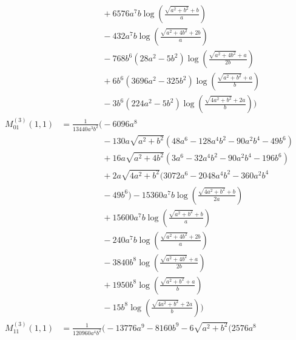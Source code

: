 \begin{align*}
&\phantom{{}=\frac{1}{13440 a^{3} b^{2}}\Bigg(}+ 6576 a^{7} b \log\left(\frac{\sqrt{a^{2} + b^{2}} + b}{a}\right)\\
&\phantom{{}=\frac{1}{13440 a^{3} b^{2}}\Bigg(}- 432 a^{7} b \log\left(\frac{\sqrt{a^{2} + 4 b^{2}} + 2 b}{a}\right)\\
&\phantom{{}=\frac{1}{13440 a^{3} b^{2}}\Bigg(}- 768 b^{6} \left(28 a^{2} - 5 b^{2}\right) \log\left(\frac{\sqrt{a^{2} + 4 b^{2}} + a}{2 b}\right)\\
&\phantom{{}=\frac{1}{13440 a^{3} b^{2}}\Bigg(}+ 6 b^{6} \left(3696 a^{2} - 325 b^{2}\right) \log\left(\frac{\sqrt{a^{2} + b^{2}} + a}{b}\right)\\
&\phantom{{}=\frac{1}{13440 a^{3} b^{2}}\Bigg(}- 3 b^{6} \left(224 a^{2} - 5 b^{2}\right) \log\left(\frac{\sqrt{4 a^{2} + b^{2}} + 2 a}{b}\right)\Bigg)\\[1.2ex]
M^{(3)}_{01}(1,1) &= \frac{1}{13440 a^{3} b^{2}}\Bigg(- 6096 a^{8}\\
&\phantom{{}=\frac{1}{13440 a^{3} b^{2}}\Bigg(}- 130 a \sqrt{a^{2} + b^{2}}\left(48 a^{6} - 128 a^{4} b^{2} - 90 a^{2} b^{4} - 49 b^{6}\right)\\
&\phantom{{}=\frac{1}{13440 a^{3} b^{2}}\Bigg(}+ 16 a \sqrt{a^{2} + 4 b^{2}}\left(3 a^{6} - 32 a^{4} b^{2} - 90 a^{2} b^{4} - 196 b^{6}\right)\\
&\phantom{{}=\frac{1}{13440 a^{3} b^{2}}\Bigg(}+ 2 a \sqrt{4 a^{2} + b^{2}}\bigl(3072 a^{6} - 2048 a^{4} b^{2} - 360 a^{2} b^{4}\\
&\phantom{{}=\frac{1}{13440 a^{3} b^{2}}\Bigg(}- 49 b^{6}\bigr) - 15360 a^{7} b \log\left(\frac{\sqrt{4 a^{2} + b^{2}} + b}{2 a}\right)\\
&\phantom{{}=\frac{1}{13440 a^{3} b^{2}}\Bigg(}+ 15600 a^{7} b \log\left(\frac{\sqrt{a^{2} + b^{2}} + b}{a}\right)\\
&\phantom{{}=\frac{1}{13440 a^{3} b^{2}}\Bigg(}- 240 a^{7} b \log\left(\frac{\sqrt{a^{2} + 4 b^{2}} + 2 b}{a}\right)\\
&\phantom{{}=\frac{1}{13440 a^{3} b^{2}}\Bigg(}- 3840 b^{8} \log\left(\frac{\sqrt{a^{2} + 4 b^{2}} + a}{2 b}\right)\\
&\phantom{{}=\frac{1}{13440 a^{3} b^{2}}\Bigg(}+ 1950 b^{8} \log\left(\frac{\sqrt{a^{2} + b^{2}} + a}{b}\right)\\
&\phantom{{}=\frac{1}{13440 a^{3} b^{2}}\Bigg(}- 15 b^{8} \log\left(\frac{\sqrt{4 a^{2} + b^{2}} + 2 a}{b}\right)\Bigg)\\[1.2ex]
M^{(3)}_{11}(1,1) &= \frac{1}{120960 a^{4} b^{2}}\Bigg(- 13776 a^{9} - 8160 b^{9} - 6 \sqrt{a^{2} + b^{2}}\bigl(2576 a^{8}\\

\end{align*}
